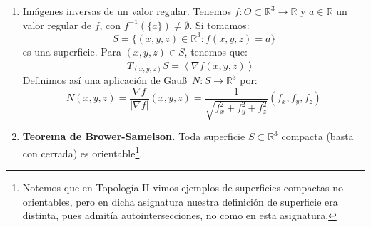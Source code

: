 \begin{ejemplo}
\begin{enumerate}
            Tenemos una aplicación diferenciable $h:U\subset\mathbb{R}^2\to \mathbb{R}^3$ que define una superficie: 
            \begin{equation*}
                S = \Gr g = \{(x,y,z)\in \mathbb{R}^3 : (x,y)\in U, \ z = h(x,y)\}
            \end{equation*}
            Podemos tomar la parametrización $X:U\to \Gr h$ dada por:
            \begin{equation*}
                X(u,v) = (u,v,h(u,v))
            \end{equation*}
            que cumple $X(U)=S$. Ahora, tenemos:
            \begin{equation*}
                X_u = (1, 0, h_u), \qquad X_v = (0, 1, h_v)
            \end{equation*}
            Sea $N^X:U\to \mathbb{R}^3$ dada por
            \begin{equation*}
                N^X = \frac{(-h_u,-h_v,1)}{\sqrt{1+h_u^2+h_v^2}} = \frac{1}{\sqrt{1+|\nabla h|^2}}(-h_u,-h_v,1)
            \end{equation*}
            Con este $N^X$ definimos la correspondiente aplicación de Gau\ss, $N=N^X\circ X^{-1}$.
        \item Imágenes inversas de un valor regular. Tenemos $f:O\subset\mathbb{R}^3\to \mathbb{R}$ y $a\in \mathbb{R}$ un valor regular de $f$, con $f^{-1}(\{a\})\neq \emptyset $. Si tomamos:
            \begin{equation*}
                S = \{(x,y,z)\in \mathbb{R}^3 : f(x,y,z)=a\}
            \end{equation*}
            es una superficie. Para $(x,y,z)\in S$, tenemos que:
            \begin{equation*}
                T_{(x,y,z)}S = \left\langle \nabla f(x,y,z) \right\rangle^\perp
            \end{equation*}
            Definimos así una aplicación de Gau\ss\ $N:S\to \mathbb{R}^3$ por:
            \begin{equation*}
                N(x,y,z) = \frac{\nabla f}{|\nabla f|}(x,y,z) = \frac{1}{\sqrt{f_x^2 + f_y^2 + f_z^2}} (f_x,f_y,f_z)
            \end{equation*}
        \item \textbf{Teorema de Brower-Samelson.} Toda superficie $S\subset\mathbb{R}^3$ compacta (basta con cerrada) es orientable\footnote{Notemos que en Topología II vimos ejemplos de superficies compactas no orientables, pero en dicha asignatura nuestra definición de superficie era distinta, pues admitía autointersecciones, no como en esta asignatura.}.
    \end{enumerate}
\end{ejemplo}

